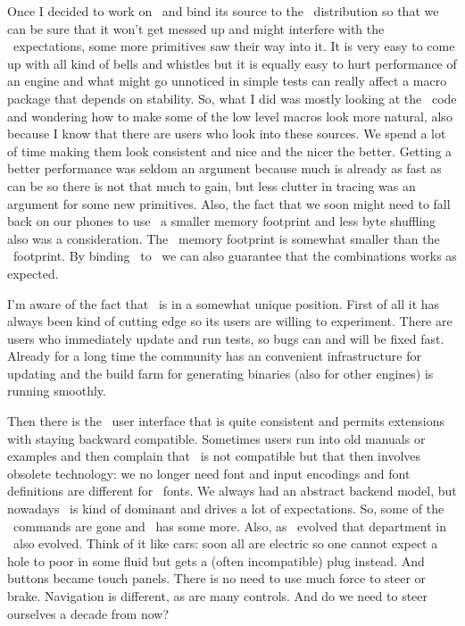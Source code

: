 Once I decided to work on \LUAMETATEX\ and bind its source to the \CONTEXT\
distribution so that we can be sure that it won't get messed up and might
interfere with the \CONTEXT\ expectations, some more primitives saw their way
into it. It is very easy to come up with all kind of bells and whistles but it is
equally easy to hurt performance of an engine and what might go unnoticed in
simple tests can really affect a macro package that depends on stability. So, what
I did was mostly looking at the \CONTEXT\ code and wondering how to make some of
the low level macros look more natural, also because I know that there are users
who look into these sources. We spend a lot of time making them look consistent
and nice and the nicer the better. Getting a better performance was seldom an
argument because much is already as fast as can be so there is not that much to
gain, but less clutter in tracing was an argument for some new primitives. Also,
the fact that we soon might need to fall back on our phones to use \TEX\ a
smaller memory footprint and less byte shuffling also was a consideration. The
\LUAMETATEX\ memory footprint is somewhat smaller than the \LUATEX\ footprint.
By binding \LUAMETATEX\ to \CONTEXT\ we can also guarantee that the combinations
works as expected.

I'm aware of the fact that \CONTEXT\ is in a somewhat unique position. First of
all it has always been kind of cutting edge so its users are willing to
experiment. There are users who immediately update and run tests, so bugs can and
will be fixed fast. Already for a long time the community has an convenient
infrastructure for updating and the build farm for generating binaries (also for
other engines) is running smoothly.

Then there is the \CONTEXT\ user interface that is quite consistent and permits
extensions with staying backward compatible. Sometimes users run into old manuals
or examples and then complain that \CONTEXT\ is not compatible but that then
involves obsolete technology: we no longer need font and input encodings and font
definitions are different for \OPENTYPE\ fonts. We always had an abstract backend
model, but nowadays \PDF\ is kind of dominant and drives a lot of expectations.
So, some of the \MKII\ commands are gone and \MKIV\ has some more. Also, as
\METAPOST\ evolved that department in \CONTEXT\ also evolved. Think of it like
cars: soon all are electric so one cannot expect a hole to poor in some fluid but
gets a (often incompatible) plug instead. And buttons became touch panels. There
is no need to use much force to steer or brake. Navigation is different, as are
many controls. And do we need to steer ourselves a decade from now?

